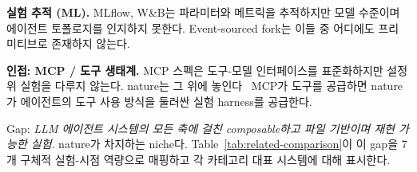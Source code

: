\documentclass[11pt,a4paper]{article}
\begin{document}
\textbf{실험 추적 (ML).} MLflow, W\&B는 파라미터와 메트릭을 추적하지만
모델 수준이며 에이전트 토폴로지를 인지하지 못한다. Event-sourced fork는
이들 중 어디에도 프리미티브로 존재하지 않는다.

\textbf{인접: MCP / 도구 생태계.} MCP 스펙은 도구-모델 인터페이스를
표준화하지만 설정 위 실험을 다루지 않는다. nature는 그 위에 놓인다
\textemdash\ MCP가 도구를 공급하면 nature가 에이전트의 도구 사용 방식을
둘러싼 실험 harness를 공급한다.

Gap: \emph{LLM 에이전트 시스템의 모든 축에 걸친 composable하고 파일
기반이며 재현 가능한 실험}. nature가 차지하는 niche다.
Table~\ref{tab:related-comparison}이 이 gap을 7개 구체적 실험-시점
역량으로 매핑하고 각 카테고리 대표 시스템에 대해 표시한다.

\begin{table}[H]
\centering\footnotesize
\setlength{\tabcolsep}{4pt}
\caption{대표 시스템 별 실험-시점 역량. 각 표시는 본 글 작성 시점
기준 documented된 시스템 capability를 반영하며, 충분한 custom
code로 가능한 범위가 아니다. $\bullet$ = repository-native하고
documented되었으며 first-class 실험 프리미티브로 노출됨 (예: 단일
}
\end{table}
\end{document}
